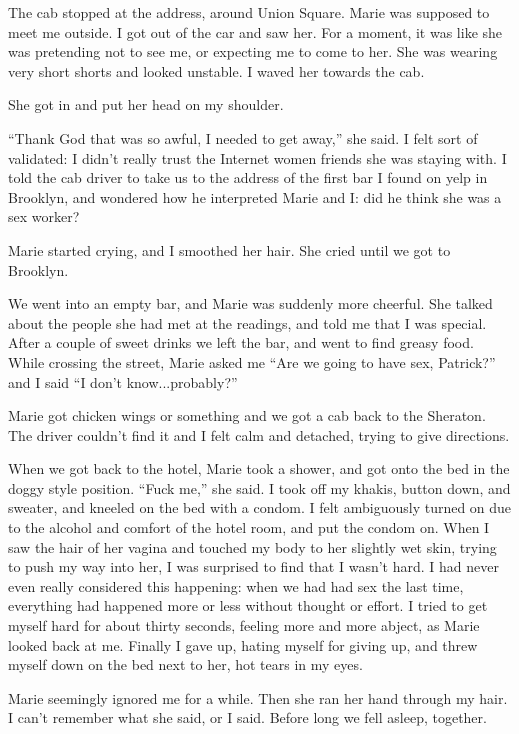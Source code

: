 \documentclass[12pt]{article}
\begin{document}
The cab stopped at the address, around Union Square.  Marie was supposed to meet
me outside.  I got out of the car and saw her.  For a moment, it was like she
was pretending not to see me, or expecting me to come to her.  She was wearing
very short shorts and looked unstable.  I waved her towards the cab.  

She got in and put her head on my shoulder.

``Thank God that was so awful, I needed to get away,'' she said.  I felt sort of
validated: I didn't really trust the Internet women friends she was staying
with.  I told the cab driver to take us to the address of the first bar I found
on yelp in Brooklyn, and wondered how he interpreted Marie and I: did he think
she was a sex worker?  

Marie started crying, and I smoothed her hair.  She cried until we got to
Brooklyn.

We went into an empty bar, and Marie was suddenly more cheerful.  She talked
about the people she had met at the readings, and told me that I was special.
After a couple of sweet drinks we left the bar, and went to find greasy food.
While crossing the street, Marie asked me ``Are we going to have sex, Patrick?''
and I said ``I don't know...probably?''

Marie got chicken wings or something and we got a cab back to the Sheraton.  The
driver couldn't find it and I felt calm and detached, trying to give directions.  

When we got back to the hotel, Marie took a shower, and got onto the bed in the
doggy style position.  ``Fuck me,'' she said.  I took off my khakis, button down,
and sweater, and kneeled on the bed with a condom.  I felt ambiguously turned on
due to the alcohol and comfort of the hotel room, and put the condom on.  When I
saw the hair of her vagina and touched my body to her slightly wet skin, trying
to push my way into her, I was surprised to find that I wasn't hard.  I had
never even really considered this happening: when we had had sex the last time,
everything had happened more or less without thought or effort.  I tried to get
myself hard for about thirty seconds, feeling more and more abject, as Marie
looked back at me.  Finally I gave up, hating myself for giving up, and threw
myself down on the bed next to her, hot tears in my eyes.

Marie seemingly ignored me for a while. Then she ran her hand through my hair.
I can't remember what she said, or I said.  Before long we fell asleep,
together.
\end{document}
